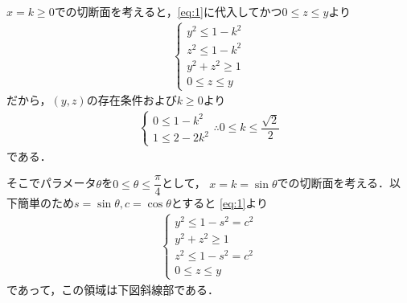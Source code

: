 \documentclass[../../main.tex]{subfiles}
\begin{document}
$x=k \ge 0$での切断面を考えると，\cref{eq:1}に代入してかつ$0 \le z \le y$より
\begin{align}
  \begin{cases}
    y^2 \le 1-k^2 \\
    z^2 \le 1-k^2 \\
    y^2 + z^2 \ge 1 \\
    0 \le z \le y
  \end{cases}
\end{align}
だから，$(y,z)$の存在条件および$k \ge 0$より
\begin{align}
  \begin{cases}
    0 \le 1-k^2 \\
    1 \le 2-2k^2
  \end{cases}
  \therefore
  0 \le k \le \dfrac{\sqrt{2}}{2}
\end{align}
である．

そこでパラメータ$\theta$を$0\le\theta\le\dfrac{\pi}{4}$として，
$x=k=\sin\theta$での切断面を考える．以下簡単のため$s=\sin\theta, c=\cos\theta$とすると
\cref{eq:1}より
\begin{align}
  \begin{cases}
    y^2\le1-s^2=c^2 \\
    y^2+z^2\ge1 \\
    z^2\le1-s^2=c^2 \\
    0 \le z \le y
  \end{cases}
\end{align}
であって，この領域は下図斜線部である．
\end{document}
